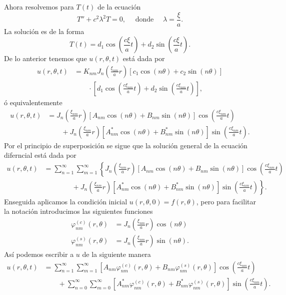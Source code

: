 \documentclass[11pt,letterpaper,draft]{report}
\newcommand\<{\langle}
\renewcommand\>{\rangle}
\renewcommand\phi\varphi
\begin{document}
\noindent Ahora resolvemos para $T(t)$ de la ecuación
\[
  T'' + c^2\lambda^2T = 0, \quad \text{ donde } \quad \lambda = \frac{\xi}{a}.
\] La solución es de la forma
\[
  T(t) = d_1 \cos\left(\frac{c\xi}{a}t\right) + d_2 \sin\left(\frac{c\xi}{a} t\right).
\] De lo anterior tenemos que $u(r,\theta,t)$ está dada por
\begin{align*}
  u(r,\theta,t) &= K_{nm} J_n\left(\frac{\xi_{nm}}{a}r\right)\left[c_1 \cos(n\theta) + c_2 \sin(n\theta)\right]\\
                &\quad\quad \cdot \left[d_1 \cos\left(\frac{c\xi_{nm}}{a}t\right) + d_2 \sin\left(\frac{c\xi_{nm}}{a}t\right)\right],
\end{align*}
ó equivalentemente
\begin{align*}
  u(r,\theta,t) &= J_n\left(\frac{\xi_{nm}}{a}r\right)\left[A_{nm}\cos(n\theta) + B_{nm}\sin(n\theta)\right]\cos\left(\frac{c\xi_{nm}}{a}t\right)\\
                &\quad\quad + J_n\left(\frac{\xi_{nm}}{a}r\right)\left[A_{nm}^{\ast}\cos(n\theta) + B_{nm}^{\ast}\sin(n\theta)\right]\sin\left(\frac{c\xi_{nm}}{a}t\right).
\end{align*} 
Por el principio de superposición se sigue que la solución general de la ecuación diferncial está dada por
\begin{align*}
  u(r,\theta,t) &= \sum_{n=1}^{\infty}\sum_{m=1}^{\infty} \left\{ J_n\left(\frac{\xi_{nm}}{a}r\right)\left[A_{nm}\cos(n\theta) + B_{nm}\sin(n\theta)\right]\cos\left(\frac{c\xi_{nm}}{a}t\right)\right.\\
                &\quad\quad\quad\quad + \left.J_n\left(\frac{\xi_{nm}}{a}r\right)\left[A_{nm}^{\ast}\cos(n\theta) + B_{nm}^{\ast}\sin(n\theta)\right]\sin\left(\frac{c\xi_{nm}}{a}t\right)\right\}.
\end{align*} 
Enseguida aplicamos la condición inicial $u(r,\theta,0) = f(r,\theta)$, pero para facilitar la notación introducimos las siguientes funciones
\begin{align*}
  \phi_{nm}^{(c)}(r,\theta) &= J_n\left(\frac{\xi_{nm}}{a} r\right)\cos(n\theta)\\
  \phi_{nm}^{(s)}(r,\theta) &= J_n\left(\frac{\xi_{nm}}{a}r\right)\sin(n\theta).
\end{align*} Así podemos escribir a $u$ de la siguiente manera
\begin{align*}
  u(r,\theta,t) &= \sum_{n=1}^{\infty}\sum_{m=1}^{\infty}
              \left[
              A_{nm}\phi_{nm}^{(c)}(r,\theta)
              + B_{nm}\phi_{nm}^{(s)}(r,\theta)
              \right]
              \cos
              \left(
              \frac{c\xi_{nm}}{a}t
              \right)\\
           &\quad\quad + \sum_{n=0}^{\infty}\sum_{m=0}^{\infty}
              \left[
              A_{nm}^{\ast}\phi_{nm}^{(c)}(r,\theta)
              + B_{nm}^{\ast}\phi_{nm}^{(s)}(r,\theta)
              \right]
              \sin
              \left(
              \frac{c\xi_{nm}}{a}t
              \right).
\end{align*}
\end{document}
